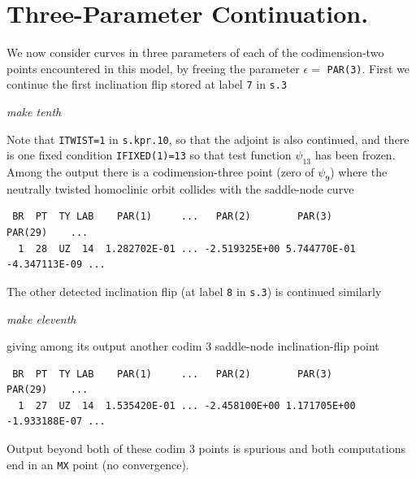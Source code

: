 \documentclass[12pt]{report}
\def\eps{\epsilon}
\begin{document}
\section{Three-Parameter Continuation.}
We now consider curves in three parameters of each of
the codimension-two points encountered in this model, by
freeing the parameter $\eps=$ {\tt PAR(3)}.
First we continue the first inclination flip stored at label
{\tt 7} in {\tt s.3}
\begin{center}
\it make tenth
\end{center}
Note that {\tt ITWIST=1} in {\tt s.kpr.10}, so that the adjoint is also
continued, and there is one fixed condition {\tt IFIXED(1)=13} so that
test function $\psi_{13}$ has been frozen.
Among the output there is a codimension-three point (zero of $\psi_9$)
where the neutrally twisted homoclinic orbit collides with the saddle-node
curve
\begin{verbatim}
 BR  PT  TY LAB    PAR(1)     ...   PAR(2)        PAR(3)        PAR(29)    ...     
  1  28  UZ  14  1.282702E-01 ... -2.519325E+00 5.744770E-01 -4.347113E-09 ...
\end{verbatim}
The other detected inclination flip (at label {\tt 8} in {\tt s.3}) is continued
similarly
\begin{center}
\it make eleventh
\end{center}
giving among its output another codim 3 saddle-node inclination-flip point
\begin{verbatim} 
 BR  PT  TY LAB    PAR(1)     ...   PAR(2)        PAR(3)        PAR(29)    ...  
  1  27  UZ  14  1.535420E-01 ... -2.458100E+00 1.171705E+00 -1.933188E-07 ... 
\end{verbatim}
Output beyond both of these codim 3 points is spurious and both computations end in
an {\tt MX} point (no convergence).
\end{document}
